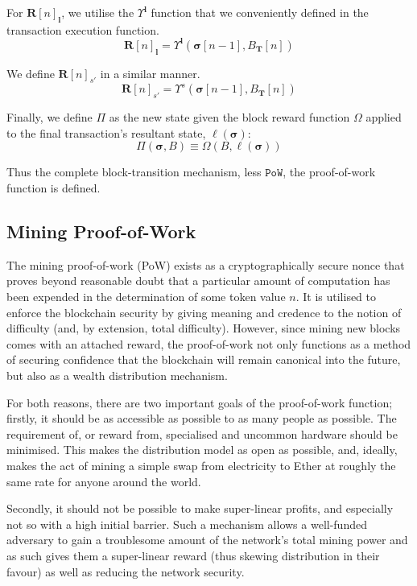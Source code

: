 \documentclass[9pt,oneside]{amsart}
\begin{document}
\begin{multicols}{2}
For $\mathbf{R}[n]_\mathbf{l}$, we utilise the $\Upsilon^\mathbf{l}$ function that we conveniently defined in the transaction execution function.
\begin{equation}
\mathbf{R}[n]_\mathbf{l} =
\Upsilon^\mathbf{l}(\boldsymbol{\sigma}[n - 1], B_\mathbf{T}[n])
\end{equation}

We define $\mathbf{R}[n]_{s'}$ in a similar manner.
\begin{equation}
\mathbf{R}[n]_{s'} =
\Upsilon^{s}(\boldsymbol{\sigma}[n - 1], B_\mathbf{T}[n])
\end{equation}

Finally, we define $\Pi$ as the new state given the block reward function $\Omega$ applied to the final transaction's resultant state, $\ell(\boldsymbol{\sigma})$:
\begin{equation}
\Pi(\boldsymbol{\sigma}, B) \equiv \Omega(B, \ell(\boldsymbol{\sigma}))
\end{equation}

Thus the complete block-transition mechanism, less $\mathtt{PoW}$, the proof-of-work function is defined.

\subsection{Mining Proof-of-Work} \label{ch:pow}

The mining proof-of-work (PoW) exists as a cryptographically secure nonce that proves beyond reasonable doubt that a particular amount of computation has been expended in the determination of some token value $n$. It is utilised to enforce the blockchain security by giving meaning and credence to the notion of difficulty (and, by extension, total difficulty). However, since mining new blocks comes with an attached reward, the proof-of-work not only functions as a method of securing confidence that the blockchain will remain canonical into the future, but also as a wealth distribution mechanism.

For both reasons, there are two important goals of the proof-of-work function; firstly, it should be as accessible as possible to as many people as possible. The requirement of, or reward from, specialised and uncommon hardware should be minimised. This makes the distribution model as open as possible, and, ideally, makes the act of mining a simple swap from electricity to Ether at roughly the same rate for anyone around the world.

Secondly, it should not be possible to make super-linear profits, and especially not so with a high initial barrier. Such a mechanism allows a well-funded adversary to gain a troublesome amount of the network's total mining power and as such gives them a super-linear reward (thus skewing distribution in their favour) as well as reducing the network security.


\end{multicols}
\end{document}
